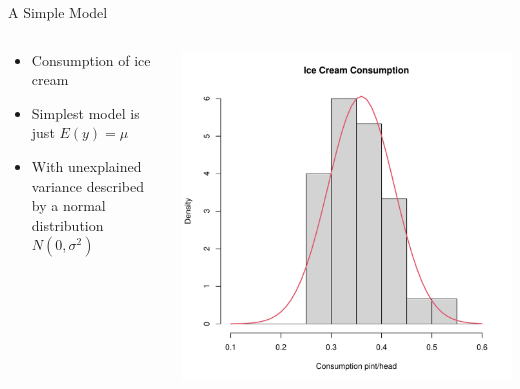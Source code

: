 \documentclass[aspectratio=169]{beamer}\usepackage[]{graphicx}\usepackage[]{color}
\makeatletter
\def\maxwidth{ %
  \ifdim\Gin@nat@width>\linewidth
    \linewidth
  \else
    \Gin@nat@width
  \fi
}
\newenvironment{knitrout}{}{} %
\makeatother
\begin{document}
\begin{frame}{A Simple Model}
\begin{columns}
  \begin{column}{0.5\textwidth}
		\begin{itemize}
			\item Consumption of ice cream
			\item Simplest model is just $E(y) = \mu$
			\item With unexplained variance described by a normal distribution $N(0, \sigma^2)$
		\end{itemize}
	\end{column}
	\begin{column}{0.5\textwidth}
\begin{knitrout}\scriptsize
{}\color{fgcolor}
\includegraphics[width=\maxwidth]{figure/unnamed-chunk-1-1} 

\end{knitrout}
\end{column}
\end{columns}
\end{frame}
\end{document}
